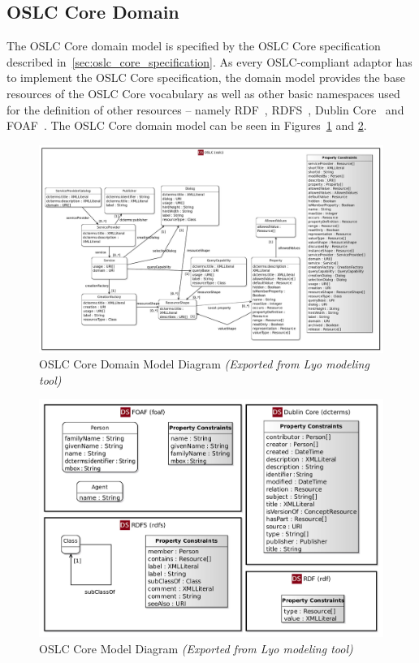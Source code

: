 \subsection*{OSLC Core Domain}
The OSLC Core domain model is specified by the OSLC Core specification described in \ref{sec:oslc_core_specification}. As every OSLC-compliant adaptor has to implement the OSLC Core specification, the domain model provides the base resources of the OSLC Core vocabulary as well as other basic namespaces used for the definition of other resources -- namely RDF \cite{rdf_namespace}, RDFS \cite{rdfs_namespace}, Dublin Core \cite{dcterms_namespace} and FOAF \cite{foaf_namespace}. The OSLC Core domain model can be seen in Figures \ref{fig:oslc_core_domain_model_diagram} and \ref{fig:oslc_core_model_diagram}.

\begin{figure}[H]
  \centering
  \begin{sideways}
    \includegraphics[width=1.45\linewidth]{figures/OSLC_Core_Domain.jpg}
  \end{sideways}

  \caption{OSLC Core Domain Model Diagram \emph{(Exported from Lyo modeling tool)}}
  \label{fig:oslc_core_domain_model_diagram} 
\end{figure}

\begin{figure}[h]
  \centering
  \includegraphics[width= .9\linewidth]{figures/Core_Domain.jpg}
  \caption{OSLC Core Model Diagram \emph{(Exported from Lyo modeling tool)}}
  \label{fig:oslc_core_model_diagram}
\end{figure}

